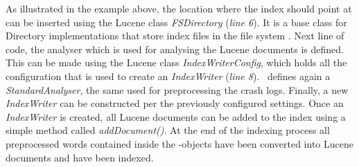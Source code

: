 As illustrated in the example above, the location where the index should point at can be inserted using the Lucene class \textit{FSDirectory} (\textit{line 6}). It is a base class for Directory implementations that store index files in the file system \cite{lucenefsdir}. 
Next line of code, the analyser which is used for analysing the Lucene documents is defined. 
This can be made using the Lucene class \textit{IndexWriterConfig}, which holds all the configuration that is used to create an \textit{IndexWriter} (\textit{line 8}). \toolname\ defines again a \textit{StandardAnalyser}, the same used for preprocessing the crash logs.
Finally, a new \textit{IndexWriter} can be constructed per the previously configured settings. 
Once an \textit{IndexWriter} is created, all Lucene documents can be added to the index using a simple method called \textit{addDocument()}. At the end of the indexing process all preprocessed words contained inside the \Crash-objects have been converted into Lucene documents and have been indexed.


